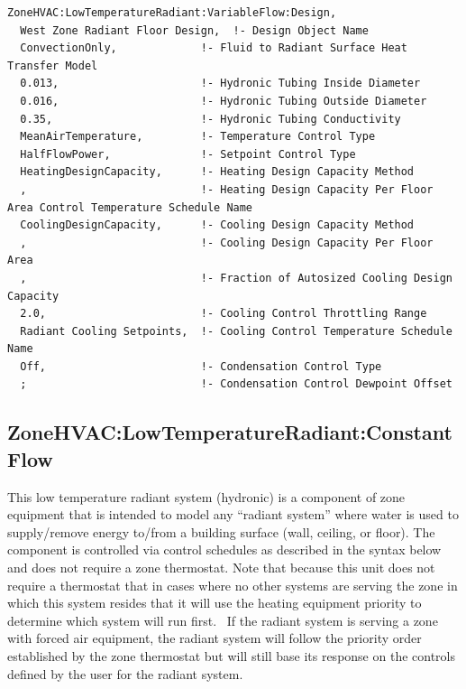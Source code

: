 \begin{lstlisting}
ZoneHVAC:LowTemperatureRadiant:VariableFlow:Design,
  West Zone Radiant Floor Design,  !- Design Object Name
  ConvectionOnly,             !- Fluid to Radiant Surface Heat Transfer Model
  0.013,                      !- Hydronic Tubing Inside Diameter
  0.016,                      !- Hydronic Tubing Outside Diameter
  0.35,                       !- Hydronic Tubing Conductivity
  MeanAirTemperature,         !- Temperature Control Type
  HalfFlowPower,              !- Setpoint Control Type
  HeatingDesignCapacity,      !- Heating Design Capacity Method
  ,                           !- Heating Design Capacity Per Floor Area Control Temperature Schedule Name
  CoolingDesignCapacity,      !- Cooling Design Capacity Method
  ,                           !- Cooling Design Capacity Per Floor Area
  ,                           !- Fraction of Autosized Cooling Design Capacity
  2.0,                        !- Cooling Control Throttling Range
  Radiant Cooling Setpoints,  !- Cooling Control Temperature Schedule Name
  Off,                        !- Condensation Control Type
  ;                           !- Condensation Control Dewpoint Offset
\end{lstlisting}


\subsection{ZoneHVAC:LowTemperatureRadiant:ConstantFlow}\label{zonehvaclowtemperatureradiantconstantflow}

This low temperature radiant system (hydronic) is a component of zone equipment that is intended to model any ``radiant system'' where water is used to supply/remove energy to/from a building surface (wall, ceiling, or floor). The component is controlled via control schedules as described in the syntax below and does not require a zone thermostat. Note that because this unit does not require a thermostat that in cases where no other systems are serving the zone in which this system resides that it will use the heating equipment priority to determine which system will run first.~ If the radiant system is serving a zone with forced air equipment, the radiant system will follow the priority order established by the zone thermostat but will still base its response on the controls defined by the user for the radiant system.

